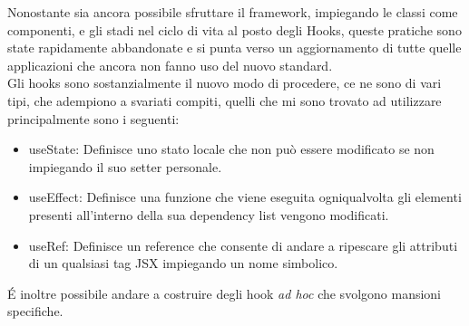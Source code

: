 Nonostante sia ancora possibile sfruttare il framework, impiegando le classi come componenti, e gli stadi nel ciclo di vita al posto degli Hooks, queste pratiche sono state rapidamente abbandonate e si punta verso un aggiornamento di tutte quelle applicazioni che ancora non fanno uso del nuovo standard.
\\
Gli hooks sono sostanzialmente il nuovo modo di procedere\cite{ReactHooks}, ce ne sono di vari tipi, che adempiono a svariati compiti, quelli che mi sono trovato ad utilizzare principalmente sono i seguenti:
\begin{itemize}
    \item useState: Definisce uno stato locale che non può essere modificato se non impiegando il suo setter personale.
    \item useEffect: Definisce una funzione che viene eseguita ogniqualvolta gli elementi presenti all'interno della sua dependency list vengono modificati.
    \item useRef: Definisce un reference che consente di andare a ripescare gli attributi di un qualsiasi tag JSX impiegando un nome simbolico.
\end{itemize}
\'E inoltre possibile andare a costruire degli hook \emph{ad hoc} che svolgono mansioni specifiche.

